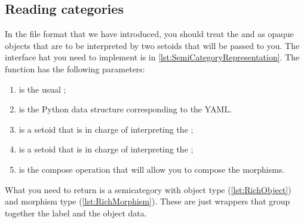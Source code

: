 \vfill
\pagebreak



\subsection{Reading categories}

In the file format that we have introduced, you should treat the  and  as opaque objects that are to be interpreted by two setoids that will be passed to you.
The interface hat you need to implement is in \cref{lst:SemiCategoryRepresentation}.
The function  has the following parameters:
\begin{enumerate}
    \item {} is the usual ;
    \item {} is the Python data structure corresponding to the YAML.
    \item {} is a setoid that is in charge of interpreting the ;
    \item {} is a setoid that is in charge of interpreting the ;
    \item {} is the compose operation that will allow you to compose the morphisms.
\end{enumerate}
What you need to return is a semicategory with object type  (\cref{lst:RichObject}) and morphism type  (\cref{lst:RichMorphism}).
These are just wrappers that group together the label and the object data.


